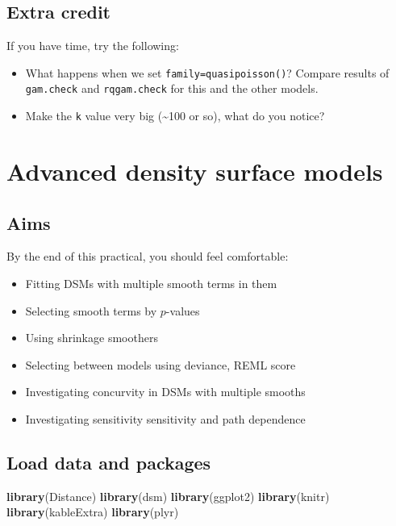 \documentclass[]{book}
\newenvironment{Shaded}{\begin{snugshade}}{\end{snugshade}}
\newcommand{\KeywordTok}[1]{\textcolor[rgb]{0.13,0.29,0.53}{\textbf{#1}}}
\newcommand{\NormalTok}[1]{#1}
\providecommand{\tightlist}{%
  \setlength{\itemsep}{0pt}\setlength{\parskip}{0pt}}
\theoremstyle{definition}
\theoremstyle{definition}
\theoremstyle{remark}
\begin{document}
\section{Extra credit}\label{extra-credit}

If you have time, try the following:

\begin{itemize}
\tightlist
\item
  What happens when we set \texttt{family=quasipoisson()}? Compare
  results of \texttt{gam.check} and \texttt{rqgam.check} for this and
  the other models.
\item
  Make the \texttt{k} value very big (\textasciitilde{}100 or so), what
  do you notice?
\end{itemize}

\chapter{Advanced density surface
models}\label{advanced-density-surface-models}

\section{Aims}\label{aims-3}

By the end of this practical, you should feel comfortable:

\begin{itemize}
\tightlist
\item
  Fitting DSMs with multiple smooth terms in them
\item
  Selecting smooth terms by \(p\)-values
\item
  Using shrinkage smoothers
\item
  Selecting between models using deviance, REML score
\item
  Investigating concurvity in DSMs with multiple smooths
\item
  Investigating sensitivity sensitivity and path dependence
\end{itemize}

\section{Load data and packages}\label{load-data-and-packages}

\begin{Shaded}
\begin{Highlighting}[]
\KeywordTok{library}\NormalTok{(Distance)}
\KeywordTok{library}\NormalTok{(dsm)}
\KeywordTok{library}\NormalTok{(ggplot2)}
\KeywordTok{library}\NormalTok{(knitr)}
\KeywordTok{library}\NormalTok{(kableExtra)}
\KeywordTok{library}\NormalTok{(plyr)}
\end{Highlighting}
\end{Shaded}
\end{document}
